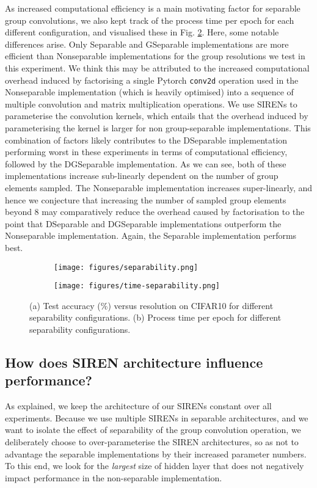 \documentclass[nohyperref]{article}
\theoremstyle{plain}
\theoremstyle{definition}
\theoremstyle{remark}
\begin{document}
As increased computational efficiency is a main motivating factor for separable group convolutions, we also kept track of the process time per epoch for each different configuration, and visualised these in Fig. \ref{fig:time-sep}. Here, some notable differences arise. Only Separable and GSeparable implementations are more efficient than Nonseparable implementations for the group resolutions we test in this experiment. We think this may be attributed to the increased computational overhead induced by factorising a single Pytorch \texttt{conv2d} operation used in the Nonseparable implementation (which is heavily optimised) into a sequence of multiple convolution and matrix multiplication operations. We use SIRENs to parameterise the convolution kernels, which entails that the overhead induced by parameterising the kernel is larger for non group-separable implementations. This combination of factors likely contributes to the DSeparable implementation performing worst in these experiments in terms of computational efficiency, followed by the DGSeparable implementation. As we can see, both of these implementations increase sub-linearly dependent on the number of group elements sampled. The Nonseparable implementation increases super-linearly, and hence we conjecture that increasing the number of sampled group elements beyond 8 may comparatively reduce the overhead caused by factorisation to the point that DSeparable and DGSeparable implementations outperform the Nonseparable implementation. Again, the Separable implementation performs best.

\begin{figure}
    \centering
    \begin{subfigure}{0.49\textwidth}
        \texttt{[image: figures/separability.png]}
        \caption{}
        \label{fig:sepconfig}
    \end{subfigure}
    \begin{subfigure}{0.49\textwidth}
        \texttt{[image: figures/time-separability.png]}
        \caption{}
        \label{fig:time-sep}
    \end{subfigure}
    \caption{(a) Test accuracy (\%) versus  resolution on CIFAR10 for different separability configurations. (b) Process time per epoch for different separability configurations.}
    \label{fig:separability}
\end{figure}



\subsection{How does SIREN architecture influence performance?} \label{app:overparameterisedsirens}
As explained, we keep the architecture of our SIRENs constant over all experiments. Because we use multiple SIRENs in separable architectures, and we want to isolate the effect of separability of the group convolution operation, we deliberately choose to over-parameterise the SIREN architectures, so as not to advantage the separable implementations by their increased parameter numbers. To this end, we look for the \textit{largest} size of hidden layer that does not negatively impact performance in the non-separable implementation.
\end{document}
